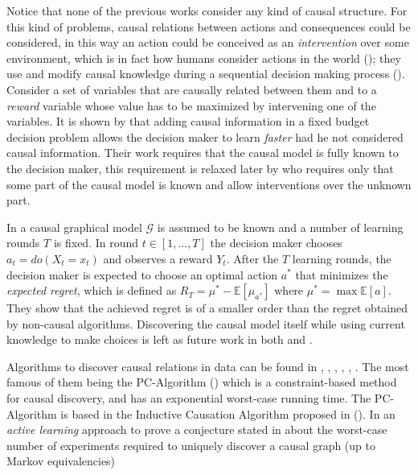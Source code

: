 \documentclass[english,letterpaper,12pt,final]{article}
\theoremstyle{definition}
\begin{document}
Notice that none of the previous works consider any kind of causal structure. For this kind of problems, causal relations between actions and consequences could be considered, in this way an action could be conceived as an \textit{intervention} over some environment, which is in fact how humans consider actions in the world (\cite{hagmayer2009decision}); they use and modify causal knowledge during a sequential decision making process (\cite{hagmayer2013repeated}). Consider a set of variables that are causally related between them and to a \textit{reward} variable whose value has to be maximized by intervening one of the variables. It is shown by \cite{lattimoreNIPS2016} that adding causal information in a fixed budget decision problem allows the decision maker to learn \textit{faster} had he not considered causal information. Their work requires that the causal model is fully known to the decision maker, this requirement is relaxed later by \cite{sen2017identifying} who requires only that some part of the causal model is known and allow interventions over the unknown part. 

In \cite{lattimoreNIPS2016} a causal graphical model $\mathcal{G}$ is assumed to be known and a number of learning rounds $T$ is fixed. In round $t \in [1,...,T]$ the decision maker chooses $a_t=do(X_t = x_t)$ and observes a reward $Y_t$. After the $T$ learning rounds, the decision maker is expected to choose an optimal action $a^\ast$ that minimizes the \textit{expected regret}, which is defined as $R_T= \mu^\ast - \mathbb{E}[\mu_{a^\ast}]$ where $\mu^\ast = \max \mathbb{E}[a]$. They show that the achieved regret is of a smaller order than the regret obtained by non-causal algorithms. Discovering the causal model itself while using current knowledge to make choices is left as future work in both \cite{lattimoreNIPS2016} and \cite{sen2017identifying}.

Algorithms to discover causal relations in data can be found in \cite{spirtes2000causation}, \cite{eberhardt2008almost}, \cite{hauser2012two}, \cite{hyttinen2013experiment}, \cite{loh2014high}, \cite{shanmugam2015learning} \cite{mooij2016distinguishing}. The most famous of them being the PC-Algorithm (\cite{spirtes2000causation}) which is a constraint-based method for causal discovery, and has an exponential worst-case running time. The PC-Algorithm is based in the Inductive Causation Algorithm proposed in (\cite{judea1990equivalence}). In \cite{hauser2012two} an \textit{active learning} approach to prove a conjecture stated in \cite{eberhardt2008causal} about the worst-case number of experiments required to uniquely discover a causal graph (up to Markov equivalencies)
\end{document}
